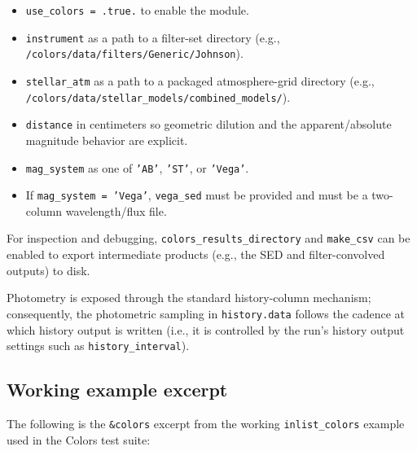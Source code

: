 \documentclass[linenumbers,apj,twocolumn, floatfix]{aastex701} \usepackage{amsmath} \usepackage{longtable} \usepackage{graphicx} \usepackage{ulem} \usepackage{xcolor} \usepackage{lettrine} \usepackage{yfonts} \usepackage{rotating}
\begin{document}
\begin{itemize}
  \item \texttt{use\_colors = .true.} to enable the module.
  \item \texttt{instrument} as a path to a filter-set directory (e.g., \texttt{/colors/data/filters/Generic/Johnson}).
  \item \texttt{stellar\_atm} as a path to a packaged atmosphere-grid directory (e.g., \texttt{/colors/data/stellar\_models/combined\_models/}).
  \item \texttt{distance} in centimeters so geometric dilution and the apparent/absolute magnitude behavior are explicit.
  \item \texttt{mag\_system} as one of \texttt{'AB'}, \texttt{'ST'}, or \texttt{'Vega'}.
  \item If \texttt{mag\_system = 'Vega'}, \texttt{vega\_sed} must be provided and must be a two-column wavelength/flux file.
\end{itemize}

For inspection and debugging, \texttt{colors\_results\_directory} and \texttt{make\_csv} can be enabled to export intermediate products (e.g., the SED and filter-convolved outputs) to disk.

Photometry is exposed through the standard history-column mechanism; consequently, the photometric sampling in \texttt{history.data} follows the cadence at which history output is written (i.e., it is controlled by the run's history output settings such as \texttt{history\_interval}).

\subsection{Working example excerpt}

The following is the \texttt{\&colors} excerpt from the working \texttt{inlist\_colors} example used in the Colors test suite:
\end{document}
